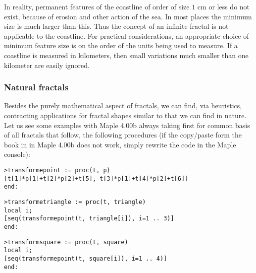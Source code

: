 	In reality, permanent features of the coastline of order of size $1$ cm or less do not exist, because of erosion and other action of the sea. In most places the minimum size is much larger than this. Thus the concept of an infinite fractal is not applicable to the coastline.
For practical considerations, an appropriate choice of minimum feature size is on the order of the units being used to measure. If a coastline is measured in kilometers, then small variations much smaller than one kilometer are easily ignored.

	
	
	\subsubsection{Natural fractals}
	Besides the purely mathematical aspect of fractals, we can find, via heuristics, contracting applications for fractal shapes similar to that we can find in nature. Let us see some examples with Maple 4.00b always taking first for common basis of all fractals that follow, the following procedures (if the copy/paste form the book in in Maple 4.00b does not work, simply rewrite the code in the Maple console):
	
	\texttt{>transforme\textunderscore point := proc(t, p)}\\
    \texttt{[t[1]*p[1]+t[2]*p[2]+t[5], t[3]*p[1]+t[4]*p[2]+t[6]]}\\
	\texttt{end:}

	\texttt{>transforme\textunderscore triangle := proc(t, triangle)}\\
    \texttt{local i;}\\
    \texttt{[seq(transforme\textunderscore point(t, triangle[i]), i=1 .. 3)]}\\
  	\texttt{end:}

  	\texttt{>transform\textunderscore square := proc(t, square)}\\
    \texttt{local i;}\\
    \texttt{[seq(transforme\textunderscore point(t, square[i]), i=1 .. 4)]}\\
	\texttt{end:}

